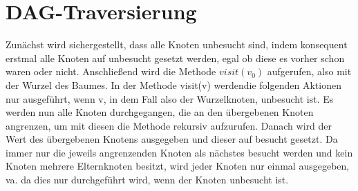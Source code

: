 \section{DAG-Traversierung}
Zunächst wird sichergestellt, dass alle Knoten unbesucht sind, indem konsequent erstmal alle Knoten auf unbesucht gesetzt werden, egal ob diese es vorher schon waren oder nicht. Anschließend wird die Methode $visit(v_0)$ aufgerufen, also mit der Wurzel des Baumes. In der Methode visit(v) werdendie folgenden Aktionen nur ausgeführt, wenn v, in dem Fall also der Wurzelknoten, unbesucht ist. Es werden nun alle Knoten durchgegangen, die an den übergebenen Knoten angrenzen, um mit diesen die Methode rekursiv aufzurufen. Danach wird der Wert des übergebenen Knotens ausgegeben und dieser auf besucht gesetzt. \newline
Da immer nur die jeweils angrenzenden Knoten als nächstes besucht werden und kein Knoten mehrere Elternknoten besitzt, wird jeder Knoten nur einmal ausgegeben, va. da dies nur durchgeführt wird, wenn der Knoten unbesucht ist.